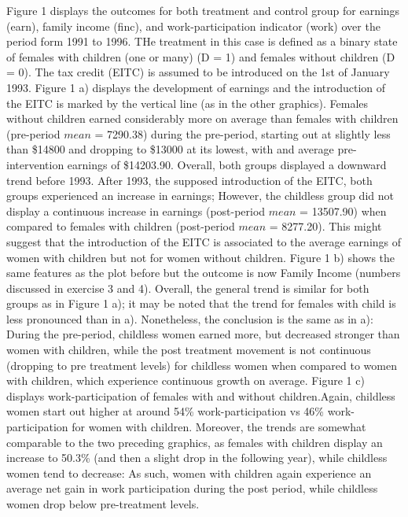 \documentclass[a4paper]{article}
\begin{document}
Figure 1 displays the outcomes for both treatment and control group for earnings (earn), family income (finc), and work-participation indicator (work) over the period form 1991 to 1996. THe treatment in this case is defined as a binary state of females with children (one or many) (D = 1) and females without children (D = 0). The tax credit (EITC) is assumed to be introduced on the 1st of January 1993.
\indent Figure 1 a) displays the development of earnings and the introduction of the EITC is marked by the vertical line (as in the other graphics). Females without children earned considerably more on average than females with children (pre-period $mean$ = 7290.38) during the pre-period, starting out at slightly less than \$14800 and dropping to \$13000 at its lowest, with and average pre-intervention earnings of \$14203.90. Overall, both groups displayed a downward trend before 1993. After 1993, the supposed introduction of the EITC, both groups experienced an increase in earnings; However, the childless group did not display a continuous increase in earnings (post-period $mean$  = 13507.90) when compared to females with children (post-period $mean$  = 8277.20). This might suggest that the introduction of the  EITC is associated to the average earnings of women with children but not for women without children.
\indent Figure 1 b) shows the same features as the plot before but the outcome is now Family Income (numbers discussed in exercise 3 and 4). Overall, the general trend is similar for both groups as in Figure 1 a); it may be noted that the trend for females with child is less pronounced than in a). Nonetheless, the conclusion is the same as in a): During the pre-period, childless women earned more, but decreased stronger than women with children, while the post treatment movement is not continuous (dropping to pre treatment levels) for childless women when compared to women with children, which experience continuous growth on average.
\indent Figure 1 c) displays work-participation of females with and without children.Again, childless women start out higher at around 54\% work-participation vs 46\% work-participation for women with children. Moreover, the trends are somewhat comparable to the two preceding graphics, as females with children display an increase to 50.3\% (and then a slight drop in the following year), while childless women tend to decrease: As such, women with children again experience an average net gain in work participation during the post period, while childless women drop below pre-treatment levels. 
\end{document}
